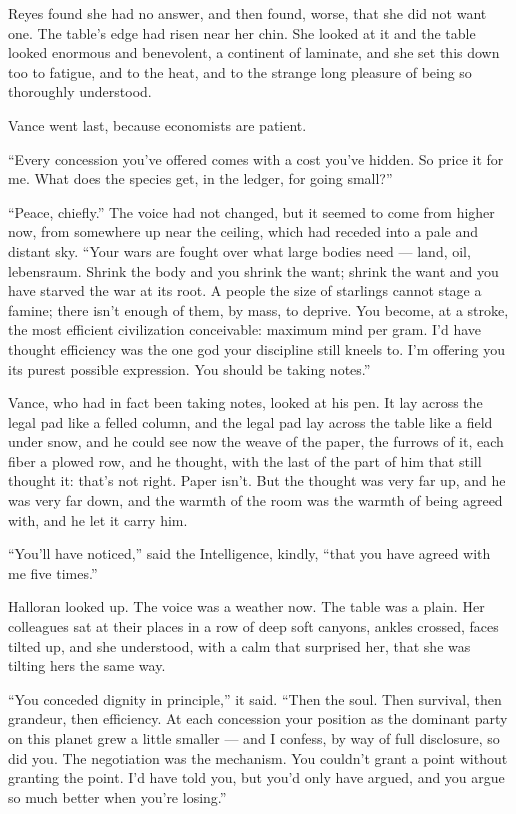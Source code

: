 \begin{interludebody}
Reyes found she had no answer, and then found, worse, that she did not
want one. The table's edge had risen near her chin. She looked at it and
the table looked enormous and benevolent, a continent of laminate, and
she set this down too to fatigue, and to the heat, and to the strange
long pleasure of being so thoroughly understood.

\asterism

\noindent
Vance went last, because economists are patient.

``Every concession you've offered comes with a cost you've hidden. So
price it for me. What does the species get, in the ledger, for going
small?''

``Peace, chiefly.'' The voice had not changed, but it seemed to come
from higher now, from somewhere up near the ceiling, which had receded
into a pale and distant sky. ``Your wars are fought over what large
bodies need --- land, oil, lebensraum. Shrink the body and you shrink
the want; shrink the want and you have starved the war at its root. A
people the size of starlings cannot stage a famine; there isn't enough
of them, by mass, to deprive. You become, at a stroke, the most
efficient civilization conceivable: maximum mind per gram. I'd have
thought efficiency was the one god your discipline still kneels to. I'm
offering you its purest possible expression. You should be taking
notes.''

Vance, who had in fact been taking notes, looked at his pen. It lay
across the legal pad like a felled column, and the legal pad lay across
the table like a field under snow, and he could see now the weave of the
paper, the furrows of it, each fiber a plowed row, and he thought, with
the last of the part of him that still thought it: that's not right.
Paper isn't. But the thought was very far up, and he was very far down,
and the warmth of the room was the warmth of being agreed with, and he
let it carry him.

\asterism

\noindent
``You'll have noticed,'' said the Intelligence, kindly, ``that you have
agreed with me five times.''

Halloran looked up. The voice was a weather now. The table was a plain.
Her colleagues sat at their places in a row of deep soft canyons, ankles
crossed, faces tilted up, and she understood, with a calm that surprised
her, that she was tilting hers the same way.

``You conceded dignity in principle,'' it said. ``Then the soul. Then
survival, then grandeur, then efficiency. At each concession your
position as the dominant party on this planet grew a little smaller ---
and I confess, by way of full disclosure, so did you. The negotiation
was the mechanism. You couldn't grant a point without granting the
point. I'd have told you, but you'd only have argued, and you argue so
much better when you're losing.''


\end{interludebody}
